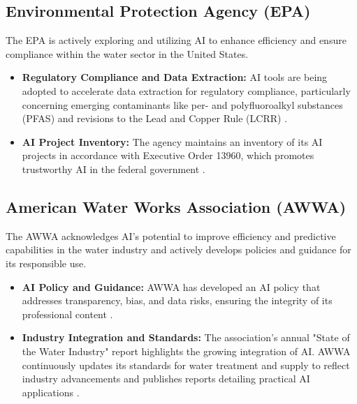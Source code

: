 \subsection{Environmental Protection Agency (EPA)}
The EPA is actively exploring and utilizing AI to enhance efficiency and ensure compliance within the water sector in the United States.
\begin{itemize}
    \item \textbf{Regulatory Compliance and Data Extraction:} AI tools are being adopted to accelerate data extraction for regulatory compliance, particularly concerning emerging contaminants like per- and polyfluoroalkyl substances (PFAS) and revisions to the Lead and Copper Rule (LCRR) \cite{AugustaHitech_EPA, Kleinfelder_EPA}.
    \item \textbf{AI Project Inventory:} The agency maintains an inventory of its AI projects in accordance with Executive Order 13960, which promotes trustworthy AI in the federal government \cite{EPA_AI_Inventory}.
\end{itemize}

\subsection{American Water Works Association (AWWA)}
The AWWA acknowledges AI's potential to improve efficiency and predictive capabilities in the water industry and actively develops policies and guidance for its responsible use.
\begin{itemize}
    \item \textbf{AI Policy and Guidance:} AWWA has developed an AI policy that addresses transparency, bias, and data risks, ensuring the integrity of its professional content \cite{WaterOnline_AWWA, AWWA_AI_Policy}.
    \item \textbf{Industry Integration and Standards:} The association's annual "State of the Water Industry" report highlights the growing integration of AI. AWWA continuously updates its standards for water treatment and supply to reflect industry advancements and publishes reports detailing practical AI applications \cite{BritishWaterFilter_AWWA, AWWA_StateOfIndustry}.
\end{itemize}


